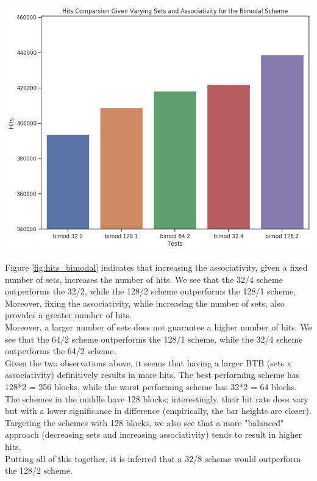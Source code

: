 \documentclass[twocolumn]{article}
\begin{document}
\begingroup
    \centering
    \medskip
    \includegraphics[width=0.68\columnwidth]{Lab-Tex/Lab9-images/hits_bimod.png}
    \label{fig:hits_bimodal}
    \medskip
\endgroup

Figure \ref{fig:hits_bimodal} indicates that increasing the associativity, given a fixed number of sets, increases the number of hits. We see that the 32/4 scheme outperforms the 32/2, while the 128/2 scheme outperforms the 128/1 scheme. Moreover, fixing the associativity, while increasing the number of sets, also provides a greater number of hits. \\

Moreover, a larger number of sets does not guarantee a higher number of hits. We see that the 64/2 scheme outperforms the 128/1 scheme, while the 32/4 scheme outperforms the 64/2 scheme. \\

Given the two observations above, it seems that having a larger BTB (sets x associativity) definitively results in more hits. The best performing scheme has 128*2 = 256 blocks, while the worst performing scheme has 32*2 = 64 blocks. The schemes in the middle have 128 blocks; interestingly, their hit rate does vary but with a lower significance in difference (empirically, the bar heights are closer). \\

Targeting the schemes with 128 blocks, we also see that a more "balanced" approach (decreasing sets and increasing associativity) tends to result in higher hits.\\

Putting all of this together, it is inferred that a 32/8 scheme would outperform the 128/2 scheme.
\end{document}
